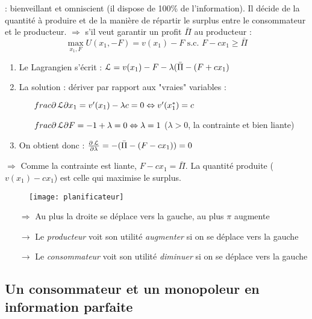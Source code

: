  : bienveillant et omniscient (il dispose de 100\% de l'information). Il décide de la quantité à produire et de la manière de répartir le surplus entre le consommateur et le producteur.
$\Rightarrow$ s'il veut garantir un profit $\bar{\Pi}$ au producteur :
\begin{equation*}
\max_{x_1, F} U(x_1, -F) = v(x_1) - F \text{ s.c. } F - c x_1 \geq \bar{\Pi}
\end{equation*}

\begin{enumerate}
\item Le Lagrangien s'écrit : $\operatorname{\mathcal{L}} = v(x_1) - F - \lambda(\bar{\Pi} - (F + c x_1)$
\item La solution : dériver par rapport aux "vraies" variables :
	\begin{enumerate}
	\item[] $frac{\partial \operatorname{\mathcal{L}}}{\partial x_1} = v'(x_1) - \lambda c = 0 \Leftrightarrow v'(x^*_1) = c$
	\item[] $frac{\partial \operatorname{\mathcal{L}}}{\partial F} = - 1 + \lambda = 0 \Leftrightarrow \lambda = 1$ ($\lambda > 0$, la contrainte et bien liante)
	\end{enumerate}
\item On obtient donc : $\frac{\partial \operatorname{\mathcal{L}}}{\partial \lambda} = -(\bar{\Pi} - (F - cx_1)) = 0$
\end{enumerate}
$\Rightarrow$ Comme la contrainte est liante, $F - c x_1 = \bar{\Pi}$.
La quantité produite ($v(x_1) - c x_1$) est celle qui maximise le surplus.
\begin{figure}[H]
	\centering
	\texttt{[image: planificateur]}
\end{figure}
\begin{itemize}
\item[$\Rightarrow$] Au plus la droite se déplace vers la gauche, au plus $\pi$ augmente
\item[$\rightarrow$] Le \textit{producteur} voit son utilité \textit{augmenter} si on se déplace vers la gauche
\item[$\rightarrow$] Le \textit{consommateur} voit son utilité \textit{diminuer} si on se déplace vers la gauche
\end{itemize}

\subsection{Un consommateur et un monopoleur en information parfaite}


